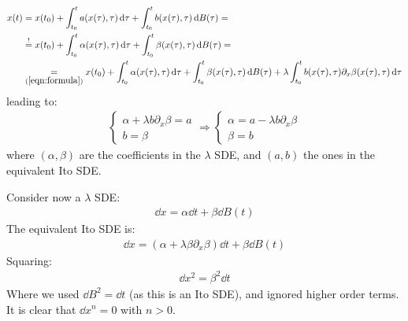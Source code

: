 \documentclass[../template.tex]{subfiles}
\begin{document}
\begin{exo}
\begin{align*}
    x(t) &= x(t_0) + \int_{t_0}^t a(x(\tau), \tau) \dd{\tau} + \int_{t_0}^t b(x(\tau), \tau) \dd{B(\tau)} =\\
    &\overset{!}{=} x(t_0) + \int_{t_0}^t \alpha(x(\tau), \tau) \dd{\tau} + \int_{t_0}^t \beta(x(\tau), \tau) \dd{B(\tau)} =\\
    &\underset{(\ref{eqn:formula})}{=} x(t_0) + \int_{t_0}^t \alpha(x(\tau), \tau) \dd{\tau} + \int_{t_0}^t \beta(x(\tau), \tau) \dd{B(\tau)} + \lambda \int_{t_0}^t b(x(\tau), \tau) \partial_x \beta(x(\tau), \tau) \dd{\tau}
\end{align*} 
leading to:
\begin{align*}
    \begin{cases}
        \alpha + \lambda b \partial_x \beta = a\\
        b = \beta
    \end{cases} \Rightarrow \begin{cases}
        \alpha = a - \lambda b \partial_x \beta\\
        \beta = b
    \end{cases}
\end{align*}
where $(\alpha, \beta)$ are the coefficients in the $\lambda$ SDE, and $(a,b)$ the ones in the equivalent Ito SDE.

Consider now a $\lambda$ SDE:
\begin{align*}
    \dd{x} = \alpha \dd{t} + \beta \dd{B(t)}
\end{align*}
The equivalent Ito SDE is:
\begin{align}\label{eqn:newdx}
    \dd{x} = (\alpha + \lambda \beta \partial_x \beta) \dd{t} + \beta \dd{B(t)}
\end{align}
Squaring:
\begin{align*}
    \dd{x}^2 = \beta^2 \dd{t}
\end{align*}
Where we used $\dd{B}^2 = \dd{t}$ (as this is an Ito SDE), and ignored higher order terms. It is clear that $\dd{x}^n = 0$ with $n > 0$.


\end{exo}
\end{document}
